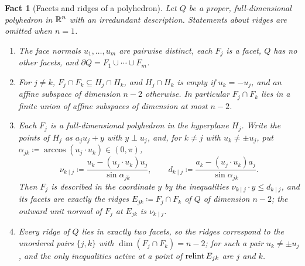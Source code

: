 \documentclass[11pt,letterpaper]{article}
\theoremstyle{plain}
\newtheorem{fact}{Fact}[section]
\begin{document}
\begin{fact}[Facets and ridges of a polyhedron]\label{tb:facets}
Let \(Q\) be a proper, full-dimensional polyhedron in \(\mathbb R^n\) with an
irredundant description. Statements about ridges are omitted when \(n=1\).
\begin{enumerate}
\item[(a)] The face normals \(u_1,\ldots,u_m\) are pairwise distinct, each
\(F_j\) is a facet, \(Q\) has no other facets, and
\(\partial Q=F_1\cup\cdots\cup F_m\).
\item[(b)] For \(j\ne k\), \(F_j\cap F_k\subseteq H_j\cap H_k\), and
\(H_j\cap H_k\) is empty if \(u_k=-u_j\), and an affine subspace of
dimension \(n-2\) otherwise. In particular \(F_j\cap F_k\) lies in a
finite union of affine subspaces of dimension at most \(n-2\).
\item[(c)] Each \(F_j\) is a full-dimensional polyhedron in the hyperplane
\(H_j\). Write the points of \(H_j\) as \(a_ju_j+y\) with \(y\perp u_j\), and,
for \(k\ne j\) with \(u_k\ne\pm u_j\), put
\(\alpha_{jk}\coloneqq \arccos(u_j\cdot u_k)\in(0,\pi)\),
\[
 \nu_{k\mid j}\coloneqq \frac{u_k-(u_j\cdot u_k)u_j}{\sin\alpha_{jk}},\qquad
 d_{k\mid j}\coloneqq \frac{a_k-(u_j\cdot u_k)a_j}{\sin\alpha_{jk}} .
\]
Then \(F_j\) is described in the coordinate \(y\) by the inequalities
\(\nu_{k\mid j}\cdot y\le d_{k\mid j}\), and its facets are exactly the
ridges \(E_{jk}\coloneqq F_j\cap F_k\) of \(Q\) of dimension \(n-2\); the outward
unit normal of \(F_j\) at \(E_{jk}\) is \(\nu_{k\mid j}\).
\item[(d)] Every ridge of \(Q\) lies in exactly two facets, so the ridges
correspond to the unordered pairs \(\{j,k\}\) with
\(\dim(F_j\cap F_k)=n-2\); for such a pair \(u_k\ne\pm u_j\), and the
only inequalities active at a point of \(\operatorname{relint} E_{jk}\) are \(j\) and \(k\).
\end{enumerate}
\end{fact}
\end{document}
